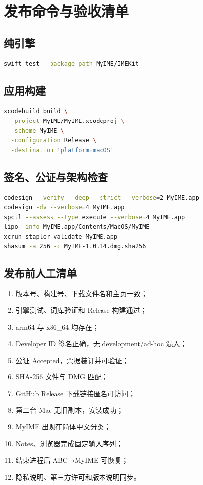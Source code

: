 \chapter{发布命令与验收清单}

\section{纯引擎}

\begin{lstlisting}[language=bash,numbers=none]
swift test --package-path MyIME/IMEKit
\end{lstlisting}

\section{应用构建}

\begin{lstlisting}[language=bash,numbers=none]
xcodebuild build \
  -project MyIME/MyIME.xcodeproj \
  -scheme MyIME \
  -configuration Release \
  -destination 'platform=macOS'
\end{lstlisting}

\section{签名、公证与架构检查}

\begin{lstlisting}[language=bash,numbers=none]
codesign --verify --deep --strict --verbose=2 MyIME.app
codesign -dv --verbose=4 MyIME.app
spctl --assess --type execute --verbose=4 MyIME.app
lipo -info MyIME.app/Contents/MacOS/MyIME
xcrun stapler validate MyIME.app
shasum -a 256 -c MyIME-1.0.14.dmg.sha256
\end{lstlisting}

\section{发布前人工清单}

\begin{enumerate}[label=$\square$]
  \item 版本号、构建号、下载文件名和主页一致；
  \item 引擎测试、词库验证和 Release 构建通过；
  \item arm64 与 x86\_64 均存在；
  \item Developer ID 签名正确，无 development/ad-hoc 混入；
  \item 公证 Accepted，票据装订并可验证；
  \item SHA-256 文件与 DMG 匹配；
  \item GitHub Release 下载链接匿名可访问；
  \item 第二台 Mac 无旧副本，安装成功；
  \item MyIME 出现在简体中文分类；
  \item Notes、浏览器完成固定输入序列；
  \item 结束进程后 ABC→MyIME 可恢复；
  \item 隐私说明、第三方许可和版本说明同步。
\end{enumerate}


